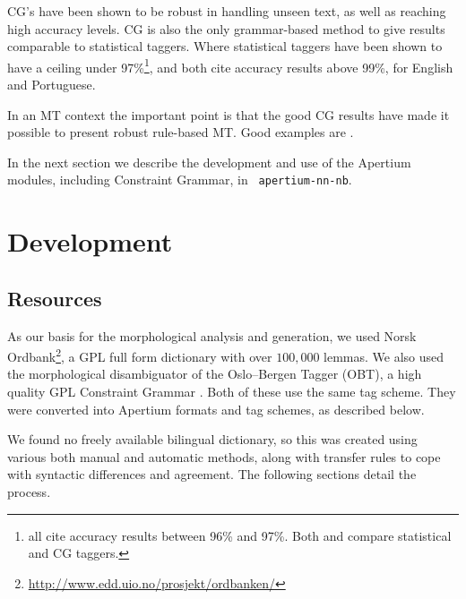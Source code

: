 \documentclass[11pt]{article}
\newcommand{\comment}[1]{\textbf{SKRIV} {\it #1}}
\renewcommand{\comment}[1]{}
\begin{document}
\comment{changed ``parse'' to ``tag'', although most CG's use some
  ``parsing'' to improve ``tagging''...}

CG's have been shown to be robust in handling unseen text, as well as
reaching high accuracy levels. CG is also the only grammar-based
method to give results comparable to statistical taggers. Where
statistical taggers have been shown to have a ceiling under
97\%\footnote{\citet{leech1994claws, brants2000tnt, brill1997uld} all
  cite accuracy results between 96\% and 97\%. Both
  \citet{chanod1995tfc} and \citet{samuelsson1997cls} compare
  statistical and CG taggers.},
\citet{voutilainen1994engcg} and \citet{bick2000palavras} both cite
accuracy results above 99\%, for English and Portuguese. 

In an MT context the important point is that the good CG results have 
made it possible to present robust rule-based MT. Good examples are
\citet{bick2007fmw}. %

In the next section we describe the development and use of the
Apertium modules, including Constraint Grammar, in {\tt \small 
  apertium-nn-nb}.

\section{Development}

  \label{sec:development}
\subsection{Resources}

As our basis for the morphological analysis and generation, we used
Norsk
Ordbank\footnote{\href{http://www.edd.uio.no/prosjekt/ordbanken/}{http://www.edd.uio.no/prosjekt/ordbanken/}
}, a GPL full form dictionary with over $100,000$ lemmas. We also used
the morphological disambiguator of the Oslo–Bergen Tagger (OBT), a
high quality GPL Constraint Grammar \citep{hagen2000cbt}. Both of
these use the same tag scheme. They were converted into Apertium
formats and tag schemes, as described below.

We found no freely available bilingual dictionary, so this was created
using various both manual and automatic methods, along with transfer
rules to cope with syntactic differences and agreement. The following
sections detail the process.
\end{document}
